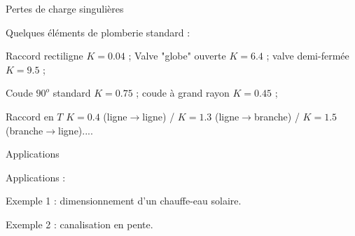 \begin{frame}{Pertes de charge singulières}
\begin{center}
\begin{picture}
  \end{picture}
\end{center}

Quelques éléments de plomberie standard :

Raccord rectiligne $K = 0.04$ ;  Valve "globe" ouverte $K = 6.4$ ; valve demi-fermée $K = 9.5$ ; 

Coude $90^o$ standard $K= 0.75$ ; coude à grand rayon $K = 0.45$ ;

Raccord en $T$ $K = 0.4$ (ligne$\rightarrow$ligne) / $K=1.3$ 
(ligne$\rightarrow$branche) / $K=1.5$ (branche$\rightarrow$ligne)....

\vspace{0mm}

\end{frame}

\begin{frame}{Applications}
\small

Applications :

\medskip 
Exemple 1 : dimensionnement d'un chauffe-eau solaire.

\medskip
Exemple 2 : canalisation en pente.


\end{frame}



